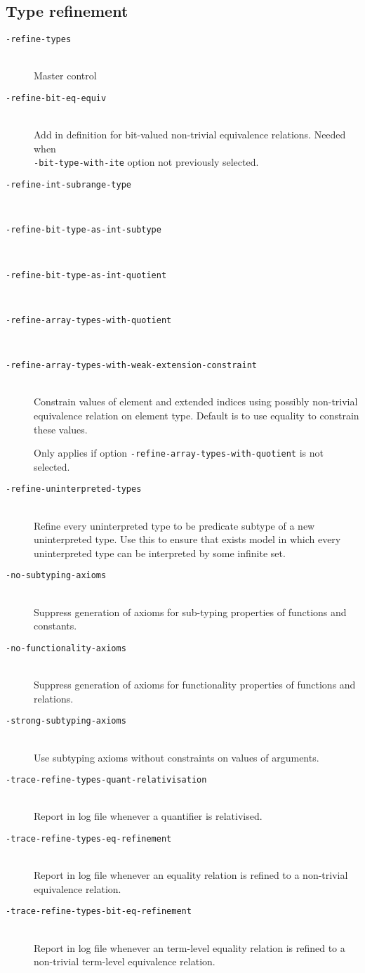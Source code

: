 \documentclass[12pt,fleqn]{article}
\newcommand{\optionb}[1]{\item[\texttt{-{#1}}]\ \\}
\begin{document}
\subsection{Type refinement}

\begin{description}
\optionb{refine-types} Master control

\optionb{refine-bit-eq-equiv} 
  Add in definition for bit-valued non-trivial equivalence relations.
  Needed when \\ \texttt{-bit-type-with-ite} option not previously selected.

\optionb{refine-int-subrange-type}       
\optionb{refine-bit-type-as-int-subtype}
\optionb{refine-bit-type-as-int-quotient}
\optionb{refine-array-types-with-quotient}

\optionb{refine-array-types-with-weak-extension-constraint}
  Constrain values of element and extended indices using possibly non-trivial
  equivalence relation on element type.  Default is to use equality to
  constrain these values.

  Only applies if option \texttt{-refine-array-types-with-quotient} is not
  selected.

\optionb{refine-uninterpreted-types}
  Refine every uninterpreted type to be predicate subtype of a new 
  uninterpreted type.  Use this to ensure that exists model in which 
  every uninterpreted type can be interpreted by some infinite set.

\optionb{no-subtyping-axioms}
  Suppress generation of axioms for sub-typing properties of functions and
  constants.

\optionb{no-functionality-axioms}
  Suppress generation of axioms for functionality properties of functions and
  relations.

\optionb{strong-subtyping-axioms}
  Use subtyping axioms without constraints on values of arguments.

\optionb{trace-refine-types-quant-relativisation}
  Report in log file whenever a quantifier is relativised.

\optionb{trace-refine-types-eq-refinement}
  Report in log file whenever an equality relation is refined to a non-trivial
  equivalence relation.

\optionb{trace-refine-types-bit-eq-refinement}
  Report in log file whenever an term-level equality relation is refined to 
  a non-trivial term-level equivalence relation.
\end{description}
\end{document}
